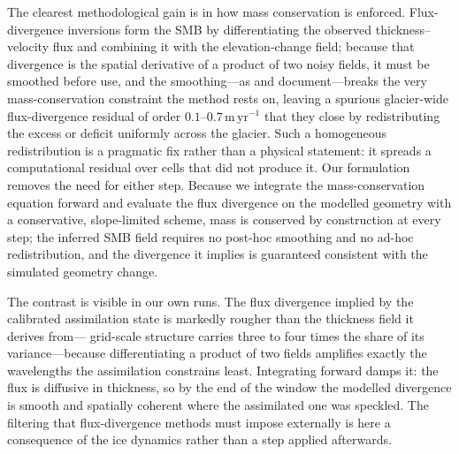 The clearest methodological gain is in how mass conservation is enforced.
Flux-divergence inversions form the SMB by differentiating the observed
thickness--velocity flux and combining it with the elevation-change field; because
that divergence is the spatial derivative of a product of two noisy fields, it must
be smoothed before use, and the smoothing---as \citet{miles2021} and \citet{kneib2024}
document---breaks
the very mass-conservation constraint the method rests on, leaving a spurious
glacier-wide flux-divergence residual of order $0.1$--$0.7\,\mathrm{m\,yr^{-1}}$ that
they close by redistributing the excess or deficit uniformly across the glacier. Such
a homogeneous redistribution is a pragmatic fix rather than a physical statement: it
spreads a computational residual over cells that did not produce it. Our formulation
removes the need for either step. Because we integrate the mass-conservation equation
forward and evaluate the flux divergence on the modelled geometry with a
conservative, slope-limited scheme, mass is conserved by construction at every step;
the inferred SMB field requires no post-hoc smoothing and no ad-hoc redistribution,
and the divergence it implies is guaranteed consistent with the simulated geometry
change.

The contrast is visible in our own runs. The flux divergence implied by the calibrated
assimilation state is markedly rougher than the thickness field it derives from---
grid-scale structure carries three to four times the share of its variance---because
differentiating a product of two fields amplifies exactly the wavelengths the
assimilation constrains least. Integrating forward damps it: the flux is diffusive in
thickness, so by the end of the window the modelled divergence is smooth and spatially
coherent where the assimilated one was speckled. The filtering that flux-divergence
methods must impose externally is here a consequence of the ice dynamics rather than a
step applied afterwards.

